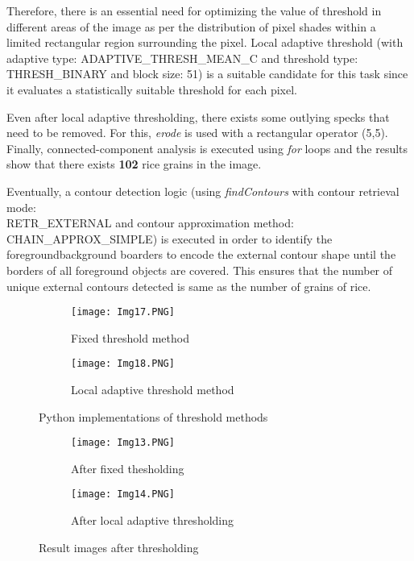 \documentclass[11pt]{scrartcl}
\begin{document}
{Therefore, there is an essential need for optimizing the value of threshold in different areas of the image as per the distribution of pixel shades within a limited rectangular region surrounding the pixel. Local adaptive threshold (with adaptive type: ADAPTIVE\_THRESH\_MEAN\_C and threshold type: THRESH\_BINARY and block size: 51) is a suitable candidate for this task since it evaluates a statistically suitable threshold for each pixel. 

Even after local adaptive thresholding, there exists some outlying specks that need to be removed. For this, \textit{erode} is used with a rectangular operator (5,5). Finally, connected-component analysis is executed using \textit{for} loops and the results show that there exists \textbf{102} rice grains in the image.

Eventually, a contour detection logic (using \textit{findContours} with contour retrieval mode: 
\\RETR\_EXTERNAL and contour approximation method: CHAIN\_APPROX\_SIMPLE) is executed in order to identify the foreground\/background boarders to encode the external contour shape until the borders of all foreground objects are covered. This ensures that the number of unique external contours detected is same as the number of grains of rice.

\begin{figure}
\centering
\begin{subfigure}{.5\textwidth}
  \centering
  \texttt{[image: Img17.PNG]}
  \caption{Fixed threshold method}
  \label{fig:sub1}
\end{subfigure}%
\begin{subfigure}{0.5\textwidth}
  \centering
  \texttt{[image: Img18.PNG]}
  \caption{Local adaptive threshold method}
  \label{fig:sub2}
\end{subfigure}
\caption{Python implementations of threshold methods}
\label{fig:test}
\end{figure}
\begin{figure}
\centering
\begin{subfigure}{.5\textwidth}
  \centering
  \texttt{[image: Img13.PNG]}
  \caption{After fixed thesholding}
  \label{fig:sub1}
\end{subfigure}%
\begin{subfigure}{0.5\textwidth}
  \centering
  \texttt{[image: Img14.PNG]}
  \caption{After local adaptive thresholding}
  \label{fig:sub2}
\end{subfigure}
\caption{Result images after thresholding}
\label{fig:test}
\end{figure}


}
\end{document}

